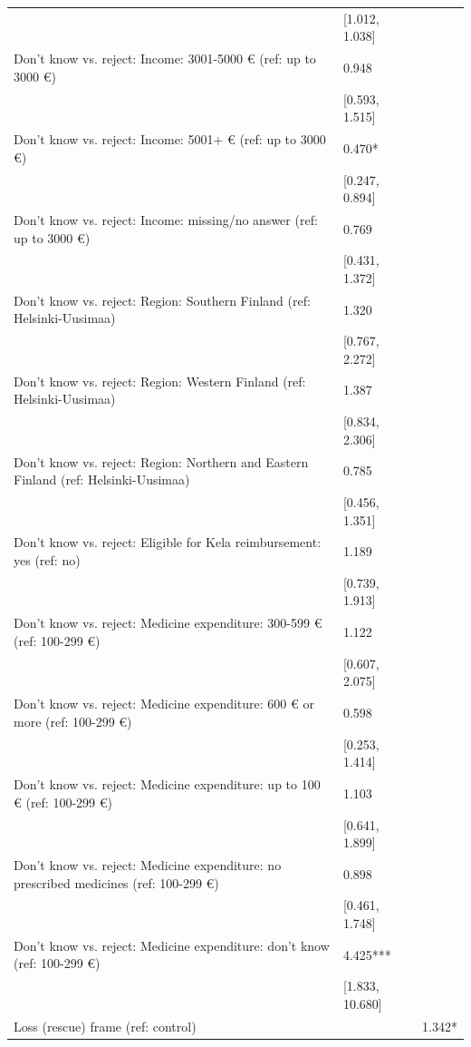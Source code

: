 \begin{tabular}{lll}
& [\num{1.012}, \num{1.038}] &  \\
Don't know vs. reject: Income: 3001-5000 € (ref: up to 3000 €) & \num{0.948} &  \\
& [\num{0.593}, \num{1.515}] &  \\
Don't know vs. reject: Income: 5001+ € (ref: up to 3000 €) & \num{0.470}* &  \\
& [\num{0.247}, \num{0.894}] &  \\
Don't know vs. reject: Income: missing/no answer (ref: up to 3000 €) & \num{0.769} &  \\
& [\num{0.431}, \num{1.372}] &  \\
Don't know vs. reject: Region: Southern Finland (ref: Helsinki-Uusimaa) & \num{1.320} &  \\
& [\num{0.767}, \num{2.272}] &  \\
Don't know vs. reject: Region: Western Finland (ref: Helsinki-Uusimaa) & \num{1.387} &  \\
& [\num{0.834}, \num{2.306}] &  \\
Don't know vs. reject: Region: Northern and Eastern Finland (ref: Helsinki-Uusimaa) & \num{0.785} &  \\
& [\num{0.456}, \num{1.351}] &  \\
Don't know vs. reject: Eligible for Kela reimbursement: yes (ref: no) & \num{1.189} &  \\
& [\num{0.739}, \num{1.913}] &  \\
Don't know vs. reject: Medicine expenditure: 300-599 € (ref: 100-299 €) & \num{1.122} &  \\
& [\num{0.607}, \num{2.075}] &  \\
Don't know vs. reject: Medicine expenditure: 600 € or more (ref: 100-299 €) & \num{0.598} &  \\
& [\num{0.253}, \num{1.414}] &  \\
Don't know vs. reject: Medicine expenditure: up to 100 € (ref: 100-299 €) & \num{1.103} &  \\
& [\num{0.641}, \num{1.899}] &  \\
Don't know vs. reject: Medicine expenditure: no prescribed medicines (ref: 100-299 €) & \num{0.898} &  \\
& [\num{0.461}, \num{1.748}] &  \\
Don't know vs. reject: Medicine expenditure: don't know (ref: 100-299 €) & \num{4.425}*** &  \\
& [\num{1.833}, \num{10.680}] &  \\
Loss (rescue) frame (ref: control) &  & \num{1.342}* \\

\end{tabular}

